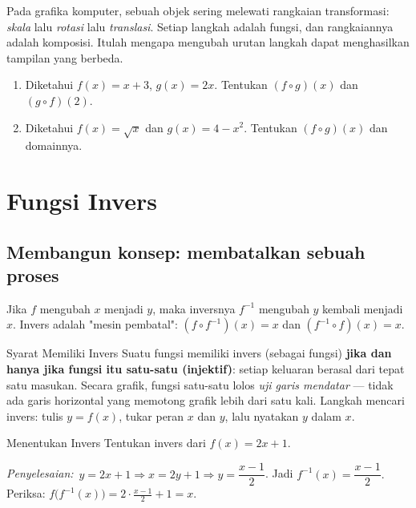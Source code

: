 \documentclass[11pt,a4paper]{report}
\theoremstyle{gaya}
\newcommand{\jawab}{\par\smallskip\noindent\textit{\textcolor{oranye}{Penyelesaian:}}\ }
\begin{document}
\begin{dunianyata}
Pada grafika komputer, sebuah objek sering melewati rangkaian transformasi: \emph{skala} lalu \emph{rotasi} lalu \emph{translasi}. Setiap langkah adalah fungsi, dan rangkaiannya adalah komposisi. Itulah mengapa mengubah urutan langkah dapat menghasilkan tampilan yang berbeda.
\end{dunianyata}

\begin{latihan}
\begin{enumerate}[leftmargin=*]
  \item Diketahui $f(x)=x+3$, $g(x)=2x$. Tentukan $(f\circ g)(x)$ dan $(g\circ f)(2)$.
  \item Diketahui $f(x)=\sqrt{x}$ dan $g(x)=4-x^2$. Tentukan $(f\circ g)(x)$ dan domainnya.
\end{enumerate}
\end{latihan}

\section{Fungsi Invers}

\subsection*{Membangun konsep: membatalkan sebuah proses}
Jika $f$ mengubah $x$ menjadi $y$, maka inversnya $f^{-1}$ mengubah $y$ kembali menjadi $x$. Invers adalah "mesin pembatal": $(f\circ f^{-1})(x)=x$ dan $(f^{-1}\circ f)(x)=x$.

\begin{konsep}{Syarat Memiliki Invers}
Suatu fungsi memiliki invers (sebagai fungsi) \textbf{jika dan hanya jika fungsi itu satu-satu (injektif)}: setiap keluaran berasal dari tepat satu masukan. Secara grafik, fungsi satu-satu lolos \emph{uji garis mendatar} --- tidak ada garis horizontal yang memotong grafik lebih dari satu kali. Langkah mencari invers: tulis $y=f(x)$, tukar peran $x$ dan $y$, lalu nyatakan $y$ dalam $x$.
\end{konsep}

\begin{contoh}{Menentukan Invers}
Tentukan invers dari $f(x) = 2x + 1$.

\jawab $y = 2x+1 \Rightarrow x = 2y+1 \Rightarrow y = \dfrac{x-1}{2}$.
Jadi $f^{-1}(x) = \dfrac{x-1}{2}.$ Periksa: $f\big(f^{-1}(x)\big)=2\cdot\tfrac{x-1}{2}+1=x.$
\end{contoh}
\end{document}
